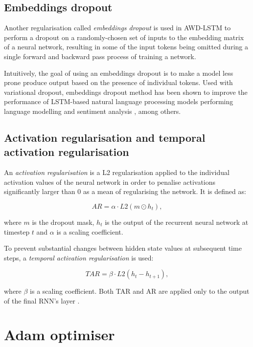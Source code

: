 \subsection{Embeddings dropout}
\label{embeddingsdropout}

Another regularisation called \emph{embeddings dropout} is used in AWD-LSTM to perform a dropout on a randomly-chosen set of inputs to the embedding matrix of a neural network, resulting in some of the input tokens being omitted during a single forward and backward pass process of training a network.

Intuitively, the goal of using an embeddings dropout is to make a model less prone produce output based on the presence of individual tokens. Used with variational dropout, embeddings dropout method has been shown to improve the performance of LSTM-based natural language processing models performing language modelling \cite{merity:awdlstm} and sentiment analysis \cite{gal:embeddingdropout}, among others.

\subsection{Activation regularisation and temporal activation regularisation}

An \emph{activation regularisation} is a L2 regularisation applied to the individual activation values of the neural network in order to penalise activations significantly larger than 0 as a mean of regularising the network. It is defined as:

\begin{equation}
AR = \alpha \cdot {L2}(m \odot h_t),
\end{equation}

where $m$ is the dropout mask, $h_t$ is the output of the recurrent neural network at timestep $t$ and $\alpha$ is a scaling coefficient. 

To prevent substantial changes between hidden state values at subsequent time steps, a \emph{temporal activation regularisation} is used:

\begin{equation}
TAR = \beta \cdot L2(h_t - h_{t+1}),
\end{equation}

where $\beta$ is a scaling coefficient. Both TAR and AR are applied only to the output of the final RNN's layer \cite{merity:regularisations,merity:awdlstm}.

\section{Adam optimiser}
\label{adam:optimiser}

